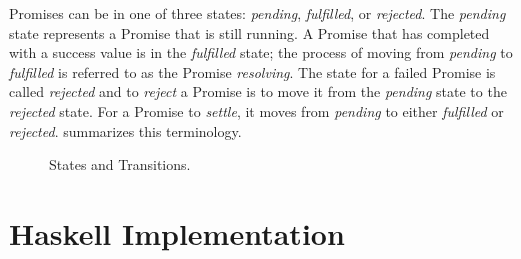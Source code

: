 \documentclass[12pt, english, letterpaper]{kuthesis}
\begin{document}
\textsf{Promises} can be in one of three states: \emph{pending}, \emph{fulfilled}, or \emph{rejected}.  The \emph{pending} state represents a \textsf{Promise} that is still running.  A \textsf{Promise} that has completed with a success value is in the \emph{fulfilled} state; the process of moving from \emph{pending} to \emph{fulfilled} is referred to as the \textsf{Promise} \emph{resolving}.  The state for a failed \textsf{Promise} is called \emph{rejected} and to \emph{reject} a \textsf{Promise} is to move it from the \emph{pending} state to the \emph{rejected} state.  For a \textsf{Promise} to \emph{settle}, it moves from \emph{pending} to either \emph{fulfilled} or \emph{rejected}.   summarizes this terminology.

\begin{figure}
\begin{center}  \end{center}
\caption{States and Transitions.}
\label{fig:states}
\end{figure}

\chapter*{Haskell Implementation}
\end{document}
